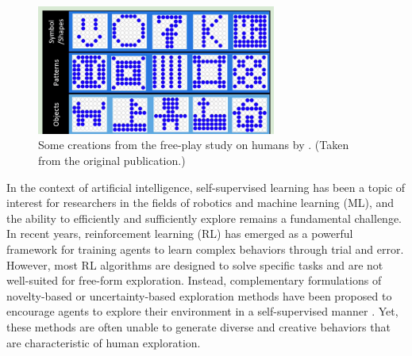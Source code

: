 \begin{figure}[h]
    \centering
    \includegraphics[width=0.7\textwidth]{images/diggs.png}
    \caption{Some creations from the free-play study on humans by \cite{diggs}. (Taken from the original publication.)}
    \label{fig:diggs}
\end{figure}


In the context of artificial intelligence, self-supervised learning has been a topic of interest for researchers in the fields of robotics and machine learning (ML), and the ability to efficiently and sufficiently explore remains a fundamental challenge.
In recent years, reinforcement learning (RL) has emerged as a powerful framework for training agents to learn complex behaviors through trial and error.
However, most RL algorithms are designed to solve specific tasks and are not well-suited for free-form exploration.
Instead, complementary formulations of novelty-based or uncertainty-based exploration methods have been proposed to encourage agents to explore their environment in a self-supervised manner \citep{rnd,icm,disagreement,exploration_survey}. 
Yet, these methods are often unable to generate diverse and creative behaviors that are characteristic of human exploration.




